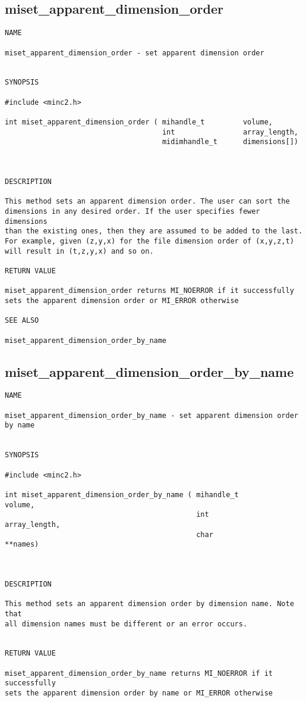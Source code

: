 \documentclass{article}
\begin{document}
\subsection{miset\_apparent\_dimension\_order}
\begin{verbatim}
NAME 

miset_apparent_dimension_order - set apparent dimension order


SYNOPSIS

#include <minc2.h>

int miset_apparent_dimension_order ( mihandle_t         volume,
                                     int                array_length,
                                     midimhandle_t      dimensions[])
                                     


DESCRIPTION

This method sets an apparent dimension order. The user can sort the
dimensions in any desired order. If the user specifies fewer dimensions
than the existing ones, then they are assumed to be added to the last.
For example, given (z,y,x) for the file dimension order of (x,y,z,t) 
will result in (t,z,y,x) and so on. 

RETURN VALUE

miset_apparent_dimension_order returns MI_NOERROR if it successfully
sets the apparent dimension order or MI_ERROR otherwise

SEE ALSO

miset_apparent_dimension_order_by_name
\end{verbatim}

\subsection{miset\_apparent\_dimension\_order\_by\_name}
\begin{verbatim}
NAME 

miset_apparent_dimension_order_by_name - set apparent dimension order
by name


SYNOPSIS

#include <minc2.h>

int miset_apparent_dimension_order_by_name ( mihandle_t         volume,
                                             int                array_length,
                                             char               **names)
                                             


DESCRIPTION

This method sets an apparent dimension order by dimension name. Note that
all dimension names must be different or an error occurs.


RETURN VALUE

miset_apparent_dimension_order_by_name returns MI_NOERROR if it successfully
sets the apparent dimension order by name or MI_ERROR otherwise
\end{verbatim}
\end{document}
